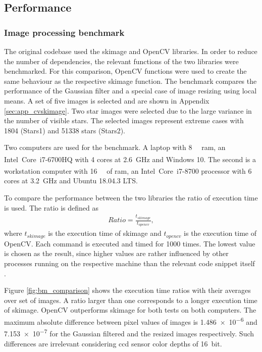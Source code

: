 \subsection{Performance}
\subsubsection{Image processing benchmark} \label{sec:cvskimage}
The original codebase used the \gls{skimage} and OpenCV libraries. In order to reduce the number of dependencies, the relevant functions of the two libraries were benchmarked. For this comparison, OpenCV functions were used to create the same behaviour as the respective \gls{skimage} function. The benchmark compares the performance of the Gaussian filter and a special case of image resizing using local means. A set of five images is selected and are shown in Appendix \ref{sec:app_cvskimage}. Two star images were selected due to the large variance in the number of visible stars. The selected images represent extreme cases with 1804 (Stars1) and 51338 stars (Stars2).

Two computers are used for the benchmark. A laptop with \SI{8}{\giga\byte} \gls{ram}, an Intel\textsuperscript{\textregistered}~Core\texttrademark~i7-6700HQ with \SI{4}{} cores at \SI{2.6}{\giga\hertz} and Windows 10. The second is a workstation computer with \SI{16}{\giga\byte} of \gls{ram}, an Intel\textsuperscript{\textregistered}~Core\texttrademark~i7-8700 processor with \SI{6}{} cores at \SI{3.2}{\giga\hertz} and Ubuntu 18.04.3 LTS.

To compare the performance between the two libraries the ratio of execution time is used. The ratio is defined as
\begin{align}
    Ratio = \frac{t_{skimage}}{t_{opencv}}, \label{eq:bm_exec_ratio}
\end{align}
where $t_{skimage}$ is the execution time of \gls{skimage} and $t_{opencv}$ is the execution time of OpenCV. Each command is executed and timed for 1000 times. The lowest value is chosen as the result, since higher values are rather influenced by other processes running on the respective machine than the relevant code snippet itself \cite{timeit2020}.

Figure \ref{fig:bm_comparison} shows the execution time ratios with their averages over set of images. A ratio larger than one corresponds to a longer execution time of \gls{skimage}. OpenCV outperforms \gls{skimage} for both tests on both computers. The maximum absolute difference between pixel values of images is \SI{1.486e-6}{} and \SI{7.153e-7}{} for the Gaussian filtered and the resized images respectively. Such differences are irrelevant considering \gls{ccd} sensor color depths of \SI{16}{bit}.

